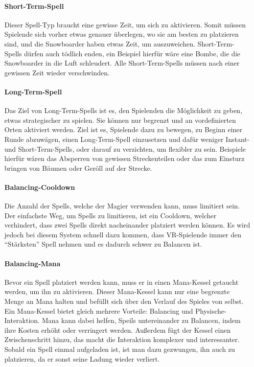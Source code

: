 \paragraph{Short-Term-Spell}
Dieser Spell-Typ braucht eine gewisse Zeit, um sich zu aktivieren. Somit müssen Spielende sich vorher etwas genauer überlegen, wo sie am besten zu platzieren sind, und die Snowboarder haben etwas Zeit, um auszuweichen. Short-Term-Spells dürfen auch tödlich enden, ein Beispiel hierfür wäre eine Bombe, die die Snowboarder in die Luft schleudert. Alle Short-Term-Spells müssen nach einer gewissen Zeit wieder verschwinden.

\paragraph{Long-Term-Spell}
Das Ziel von Long-Term-Spells ist es, den Spielenden die Möglichkeit zu geben, etwas strategischer zu spielen. Sie können nur begrenzt und an vordefinierten Orten aktiviert werden. Ziel ist es, Spielende dazu zu bewegen, zu Beginn einer Runde abzuwägen, einen Long-Term-Spell einzusetzen und dafür weniger Instant- und Short-Term-Spells, oder darauf zu verzichten, um flexibler zu sein. Beispiele hierfür wären das Absperren von gewissen Streckenteilen oder das zum Einsturz bringen von Bäumen oder Geröll auf der Strecke.

\paragraph{Balancing-Cooldown}
Die Anzahl der Spells, welche der Magier verwenden kann, muss limitiert sein. Der einfachste Weg, um Spells zu limitieren, ist ein Cooldown, welcher verhindert, dass zwei Spells direkt nacheinander platziert werden können. Es wird jedoch bei diesem System schnell dazu kommen, dass VR-Spielende immer den "`Stärksten"' Spell nehmen und es dadurch schwer zu Balancen ist.

\paragraph{Balancing-Mana\label{_mana}}
Bevor ein Spell platziert werden kann, muss er in einen Mana-Kessel getaucht werden, um ihn zu aktivieren. Dieser Mana-Kessel kann nur eine begrenzte Menge an Mana halten und befüllt sich über den Verlauf des Spieles von selbst. Ein Mana-Kessel bietet gleich mehrere Vorteile: Balancing und Physische-Interaktion. Mana kann dabei helfen, Speils untereinander zu Balancen, indem ihre Kosten erhöht oder verringert werden. Außerdem fügt der Kessel einen Zwischenschritt hinzu, das macht die Interaktion komplexer und interessanter. Sobald ein Spell einmal aufgeladen ist, ist man dazu gezwungen, ihn auch zu platzieren, da er sonst seine Ladung wieder verliert.

